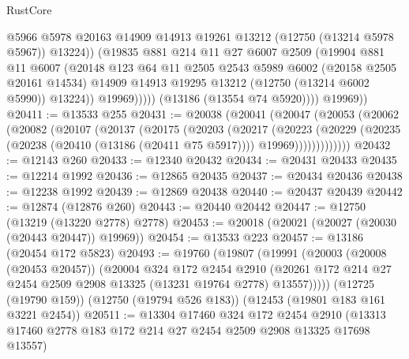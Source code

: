 \begin{lexlean}{RustCore}
\begin{coremodule}
                        @5966
                        @5978
                        @20163
                        @14909
                        @14913
                        @19261
                        @13212
                        (@12750 (@13214 @5978 @5967))
                        @13224))
                    (@19835
                      @881
                      @214
                      @11
                      @27
                      @6007
                      @2509
                      (@19904
                        @881
                        @11
                        @6007
                        (@20148
                          @123
                          @64
                          @11
                          @2505
                          @2543
                          @5989
                          @6002
                          (@20158 @2505 @20161 @14534)
                          @14909
                          @14913
                          @19295
                          @13212
                          (@12750 (@13214 @6002 @5990))
                          @13224))
                      @19969)))))
            (@13186 (@13554 @74 @5920))))
        @19969))
@20411 := @13533 @255
@20431 := @20038
    (@20041
      (@20047
        (@20053
          (@20062
            (@20082
              (@20107
                (@20137
                  (@20175
                    (@20203
                      (@20217
                        (@20223
                          (@20229
                            (@20235
                              (@20238 (@20410 (@13186 (@20411 @75 @5917))))
                              @19969)))))))))))))
@20432 := @12143 @260
@20433 := @12340 @20432
@20434 := @20431 @20433
@20435 := @12214 @1992
@20436 := @12865 @20435
@20437 := @20434 @20436
@20438 := @12238 @1992
@20439 := @12869 @20438
@20440 := @20437 @20439
@20442 := @12874 (@12876 @260)
@20443 := @20440 @20442
@20447 := @12750 (@13219 (@13220 @2778) @2778)
@20453 := @20018 (@20021 (@20027 (@20030 (@20443 @20447)) @19969))
@20454 := @13533 @223
@20457 := @13186 (@20454 @172 @5823)
@20493 := @19760
    (@19807
      (@19991
        (@20003
          (@20008 (@20453 @20457))
          (@20004
            @324
            @172
            @2454
            @2910
            (@20261 @172 @214 @27 @2454 @2509 @2908 @13325 (@13231 @19764 @2778) @13557)))))
    (@12725 (@19790 @159))
    (@12750 (@19794 @526 @183))
    (@12453 (@19801 @183 @161 @3221 @2454))
@20511 := @13304
    @17460
    @324
    @172
    @2454
    @2910
    (@13313 @17460 @2778 @183 @172 @214 @27 @2454 @2509 @2908 @13325 @17698 @13557)

\end{coremodule}
\end{lexlean}
